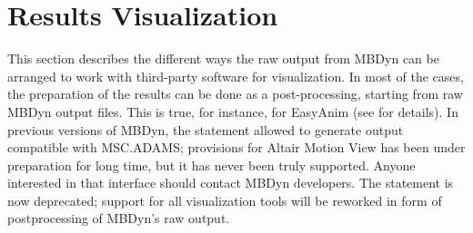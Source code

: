 %
%
%
%
%
% 
%
%

\chapter{Results Visualization}
\label{sec:APP:OUTPUTRESULTS}
This section describes the different ways the raw output from MBDyn
can be arranged to work with third-party software for visualization.
In most of the cases, the preparation of the results can be done 
as a post-processing, starting from raw MBDyn output files.
This is true, for instance, for EasyAnim (see
for details).
In previous versions of MBDyn, the  statement
allowed to generate output compatible with MSC.ADAMS; provisions 
for Altair Motion View has been under preparation for long time,
but it has never been truly supported.
Anyone interested in that interface should contact MBDyn developers.
The  statement is now deprecated;
support for all visualization tools will be reworked
in form of postprocessing of MBDyn's raw output.

